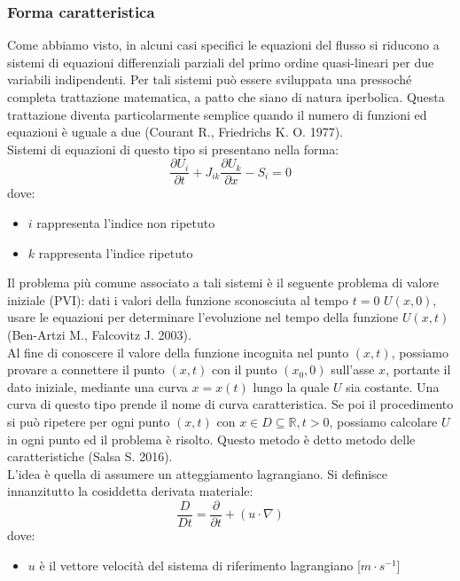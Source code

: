 \documentclass[12pt]{article} %
\begin{document}
\subsubsection{Forma caratteristica}
\noindent Come abbiamo visto, in alcuni casi specifici le equazioni del flusso si riducono a sistemi di equazioni differenziali parziali del primo ordine quasi-lineari per due variabili indipendenti. Per tali sistemi può essere sviluppata una pressoché completa trattazione matematica, a patto che siano di natura iperbolica. Questa trattazione diventa particolarmente semplice quando il numero di funzioni ed equazioni è uguale a due (Courant R., Friedrichs K. O. 1977). \\
\noindent Sistemi di equazioni di questo tipo si presentano nella forma:
\begin{equation}
    \frac{\partial U_i}{\partial t}+J_{ik}\frac{\partial U_k}{\partial x}-S_i  = 0
    \label{eqn:sistema_iperbolico}
\end{equation}
\noindent dove:
\begin{itemize}
    \item $i$ rappresenta l'indice non ripetuto
    \item $k$ rappresenta l'indice ripetuto
\end{itemize}
\noindent Il problema più comune associato a tali sistemi è il seguente problema di valore iniziale (PVI): dati i valori della funzione sconosciuta al tempo $t=0$ $U(x,0)$, usare le equazioni per determinare l’evoluzione nel tempo della funzione $U(x,t)$ (Ben-Artzi M., Falcovitz J. 2003).\\
Al fine di conoscere il valore della funzione incognita nel punto $(x,t)$, possiamo provare a connettere il punto $(x,t)$ con il punto $(x_0,0)$ sull'asse $x$, portante il dato iniziale, mediante una curva $x=x(t)$ lungo la quale $U$ sia costante. Una curva di questo tipo prende il nome di curva caratteristica. Se poi il procedimento si può ripetere per ogni punto $(x,t)$ con  $x\in D \subseteq \mathbb{R}, t>0$, possiamo calcolare $ U$ in ogni punto ed il problema è risolto. Questo metodo è detto metodo delle caratteristiche (Salsa S. 2016).\\
L'idea è quella di assumere un atteggiamento lagrangiano. Si definisce innanzitutto la cosiddetta derivata materiale:
\begin{equation}
    \frac{D}{Dt}=\frac{\partial }{\partial t}+\left(u\cdot\nabla\right)
    \label{eqn:derivata_materiale_3D}
\end{equation}
\noindent dove:
\begin{itemize}
    \item $u$ è il vettore velocità del sistema di riferimento lagrangiano [$m\cdot s^{-1}$]
\end{itemize}
\end{document}
